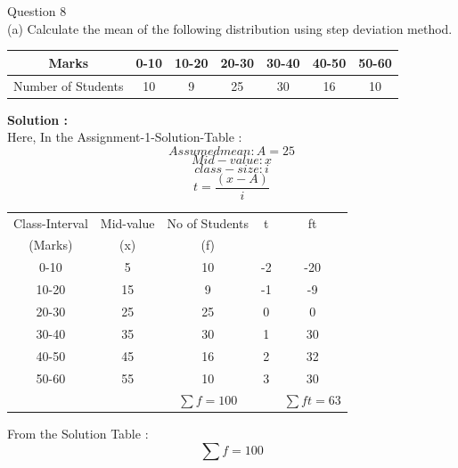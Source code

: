\documentclass[journal,12pt,twocolumn]{IEEEtran}
\begin{document}

Question 8\\

(a)	Calculate the mean of the following distribution using step deviation method.\\

\begin{table}[h!]
\center
\resizebox{\columnwidth}{!}
{
\begin{tabular}{|c|c|c|c|c|c|c|}
\hline
Marks & 0-10 & 10-20 & 20-30 & 30-40 & 40-50 & 50-60 \\
\hline
Number of Students & 10 & 9 & 25 & 30 & 16 & 10 \\
\hline
\end{tabular}
}
\end{table}
\textbf{ Solution : }\\
Here, In the Assignment-1-Solution-Table :\\
\begin{equation*}
Assumed mean : A=25
\end{equation*}
\begin{equation*}
Mid-value : x
\end{equation*}
\begin{equation*}
class-size : i
\end{equation*}
\begin{equation*}
t = \frac{(x-A)}{i}
\end{equation*}
\begin{table}[h!]
\center
\resizebox{\columnwidth}{!}
{
\begin{tabular}{|c|c|c|c|c|}
\hline
Class-Interval & Mid-value & No of Students & t & ft\\
(Marks) & (x) & (f) & & \\
\hline
0-10 & 5 & 10 & -2 & -20 \\
\hline
10-20 & 15 & 9 & -1 & -9\\
\hline
20-30 & 25 & 25 & 0 & 0\\
\hline
30-40 & 35 & 30 & 1 & 30\\
\hline
40-50 & 45 & 16 & 2 & 32\\
\hline
50-60 & 55 & 10 & 3 & 30\\
\hline
&&$\sum f = 100$ &&$ \sum ft = 63$\\
\hline
\end{tabular}
}
\end{table}
From the Solution Table :\\
\begin{equation*}
\sum f = 100
\end{equation*}
\end{document}
